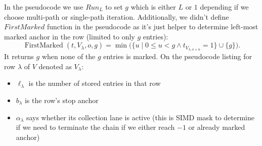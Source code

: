 In the pseudocode we use $Run_L$ to set $g$ which is either $L$ or $1$ depending if we choose multi-path or single-path iteration.
Additionally, we didn't define $FirstMarked$ function in the pseudocode as it's just helper to determine left-most marked anchor in the row (limited to only $g$ entries):
\[
  \operatorname{FirstMarked}(t,V_{\lambda},o,g)=
  \min\bigl(\{u\mid 0\leq u<g\land
    t_{V_{\lambda,o+u}}=1\}\cup\{g\}\bigr).
\]
It returns \(g\) when none of the \(g\) entries is marked.
On the pseudocode listing for row \(\lambda\) of \(V\) denoted as \(V_\lambda\):
\begin{itemize}
  \item \(\ell_\lambda\) is the number of stored entries in that row
  \item \(b_\lambda\) is the row's stop anchor
  \item \(\alpha_\lambda\) says whether its collection lane is active (this is SIMD mask to determine if we need to terminate the chain if we either reach $-1$ or already marked anchor)
\end{itemize}

